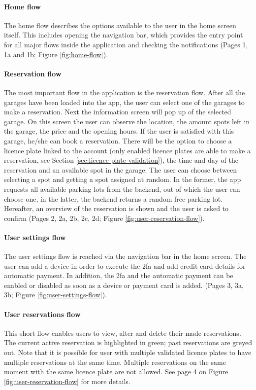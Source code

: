 \paragraph{Home flow}
The home flow describes the options available to the user in the home screen itself. This includes opening the navigation bar, which provides the entry point for all major flows inside the application and checking the notifications (Pages 1, 1a and 1b; Figure \ref{fig:home-flow}).

\paragraph{Reservation flow}
The most important flow in the application is the reservation flow. After all the garages have been loaded into the app, the user can select one of the garages to make a reservation. Next the information screen will pop up of the selected garage. On this screen the user can observe the location, the amount spots left in the garage, the price and the opening hours. If the user is satisfied with this garage, he/she can book a reservation. There will be the option to choose a licence plate linked to the account (only enabled licence plates are able to make a reservation, see Section \ref{sec:licence-plate-validation}), the time and day of the reservation and an available spot in the garage. The user can choose between selecting a spot and getting a spot assigned at random. In the former, the app requests all available parking lots from the backend, out of which the user can choose one, in the latter, the backend returns a random free parking lot. Hereafter, an overview of the reservation is shown and the user is asked to confirm (Pages 2, 2a, 2b, 2c, 2d; Figure \ref{fig:user-reservation-flow}).

\paragraph{User settings flow}
The user settings flow is reached via the navigation bar in the home screen. The user can add a device in order to execute the \ac{2fa} and add credit card details for automatic payment. In addition, the \ac{2fa} and the automatic payment can be enabled or disabled as soon as a device or payment card is added. (Pages 3, 3a, 3b; Figure \ref{fig:user-settings-flow}).

\paragraph{User reservations flow}
This short flow enables users to view, alter and delete their made reservations. The current active reservation is highlighted in green; past reservations are greyed out. Note that it is possible for user with multiple validated licence plates to have multiple reservations at the same time. Multiple reservations on the same moment with the same licence plate are not allowed. See page 4 on Figure \ref{fig:user-reservation-flow} for more details.

